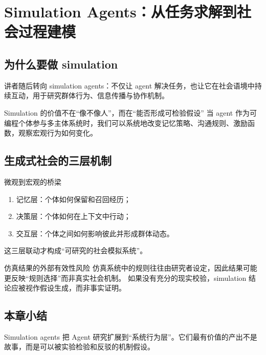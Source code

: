 \section{Simulation Agents：从任务求解到社会过程建模}

\subsection{为什么要做 simulation}
讲者随后转向 simulation agents：不仅让 agent 解决任务，也让它在社会语境中持续互动，用于研究群体行为、信息传播与协作机制。

\begin{importantbox}{Simulation 的价值不在“像不像人”，而在“能否形成可检验假设”}
当 agent 作为可编程个体参与多主体系统时，我们可以系统地改变记忆策略、沟通规则、激励函数，观察宏观行为如何变化。
\end{importantbox}

\subsection{生成式社会的三层机制}
\begin{knowledgebox}{微观到宏观的桥梁}
\begin{enumerate}
    \item 记忆层：个体如何保留和召回经历；
    \item 决策层：个体如何在上下文中行动；
    \item 交互层：个体之间如何影响彼此并形成群体动态。
\end{enumerate}
这三层联动才构成“可研究的社会模拟系统”。
\end{knowledgebox}

\begin{warningbox}{仿真结果的外部有效性风险}
仿真系统中的规则往往由研究者设定，因此结果可能更反映“规则选择”而非真实社会机制。  
如果没有充分的现实校验，simulation 结论应被视作假设生成，而非事实证明。
\end{warningbox}

\subsection{本章小结}
Simulation agents 把 Agent 研究扩展到“系统行为层”。它们最有价值的产出不是故事，而是可以被实验检验和反驳的机制假设。


